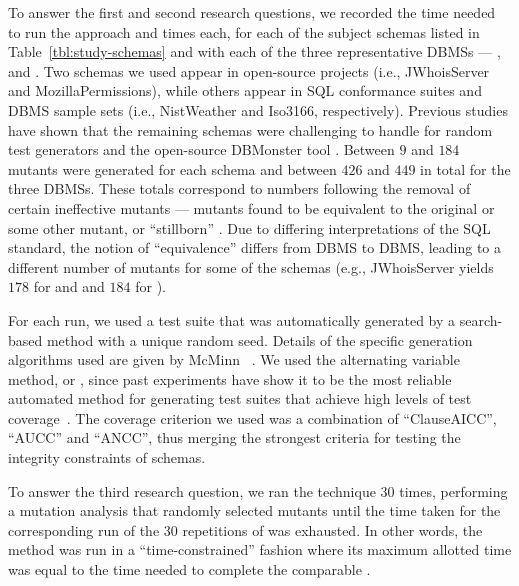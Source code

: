 \begin{sloppypar}
 To answer the first and second research \mbox{questions}, we recorded the time needed to run the \Original approach and  times each, for each of the subject schemas listed in Table~\ref{tbl:study-schemas} and with each of the three representative DBMSs --- \HyperSQL, \Postgres and \SQLite.  Two schemas we used appear in open-source projects (i.e., JWhoisServer and MozillaPermissions), while others appear in SQL conformance suites and DBMS sample sets (i.e., NistWeather and Iso3166, respectively). Previous studies have shown that the remaining schemas were challenging to handle for random test generators \cite{McMinn2015} and the open-source DBMonster tool \cite{Kapfhammer2013}.  Between $9$ and $184$ mutants were generated for each schema and between $426$ and $449$ in total for the three DBMSs. These totals correspond to numbers following the removal of certain ineffective mutants --- mutants found to be equivalent to the original or some other mutant, or ``stillborn'' \cite{Wright2014}. Due to differing interpretations of the SQL standard, the notion of ``equivalence'' differs from DBMS to DBMS, leading to a different number of mutants for some of the schemas (e.g., JWhoisServer yields $178$ for \HyperSQL and \Postgres and $184$ for \SQLite).
\end{sloppypar}


For each run, we used a test suite that was automatically generated by a search-based method with a unique random seed.  Details of the specific generation algorithms used are given by McMinn \etal~\cite{McMinn2015}. We used the alternating variable method, or \AVM, since past experiments have show it to be the most reliable automated method for generating test suites that achieve high levels of test coverage~\cite{McMinn2015}. The coverage criterion we used was a combination of ``ClauseAICC'', ``AUCC'' and ``ANCC'', thus merging the strongest criteria for testing the integrity constraints of schemas.


To answer the third research question, we ran the \Original technique $30$ times, performing a mutation analysis that randomly selected mutants until the time taken for the corresponding run of the $30$ repetitions of \vma was exhausted. In other words, the \Original method was run in a ``time-constrained'' fashion where its maximum allotted time was equal to the time needed to complete the comparable \vma.

